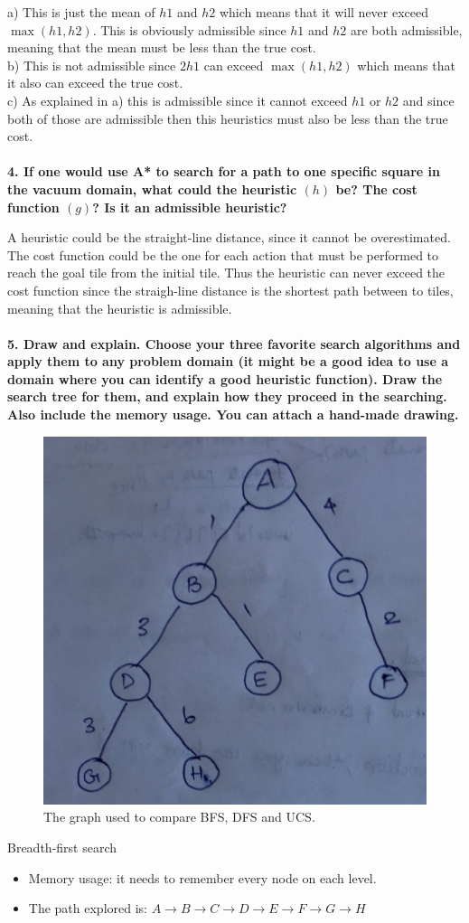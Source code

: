 \documentclass[a4paper,10pt]{article}
\begin{document}
a) This is just the mean of $h1$ and $h2$ which means that it will never exceed $\max(h1, h2)$.
This is obviously admissible since $h1$ and $h2$ are both admissible, meaning that the mean must be less than the true cost.
\\
b) This is not admissible since $2h1$ can exceed $\max(h1, h2)$ which means that it also can exceed the true cost.
\\
c) As explained in a) this is admissible since it cannot exceed $h1$ or $h2$ and since both of those are admissible then
this heuristics must also be less than the true cost.
\\ \\
\textbf{4. If one would use A* to search for a path to one specific square in the vacuum domain, what could the heuristic $(h)$ be? The cost function $(g)$? Is it an admissible heuristic?}

A heuristic could be the straight-line distance, since it cannot be overestimated. 
The cost function could be the one for each action that must be performed to reach the goal tile from the initial tile.
Thus the heuristic can never exceed the cost function since the straigh-line distance is the shortest path between to tiles, meaning that the heuristic is admissible.
\\ \\
\textbf{5. Draw and explain. 
Choose your three favorite search algorithms and apply them to any problem domain (it might be a good idea to use a domain where you can identify a good heuristic function). 
Draw the search tree for them, and explain how they proceed in the searching. 
Also include the memory usage. 
You can attach a hand-made drawing.}

\begin{figure}[ht]
	\centering
	\includegraphics[width=.4\textwidth]{graph.png}
	\caption{The graph used to compare BFS, DFS and UCS.}
\end{figure}

Breadth-first search
\begin{itemize}
	\item Memory usage: it needs to remember every node on each level.
	\item The path explored is: $A \rightarrow B \rightarrow C \rightarrow D 
	\rightarrow E \rightarrow F \rightarrow G \rightarrow H$
\end{itemize}
\end{document}
